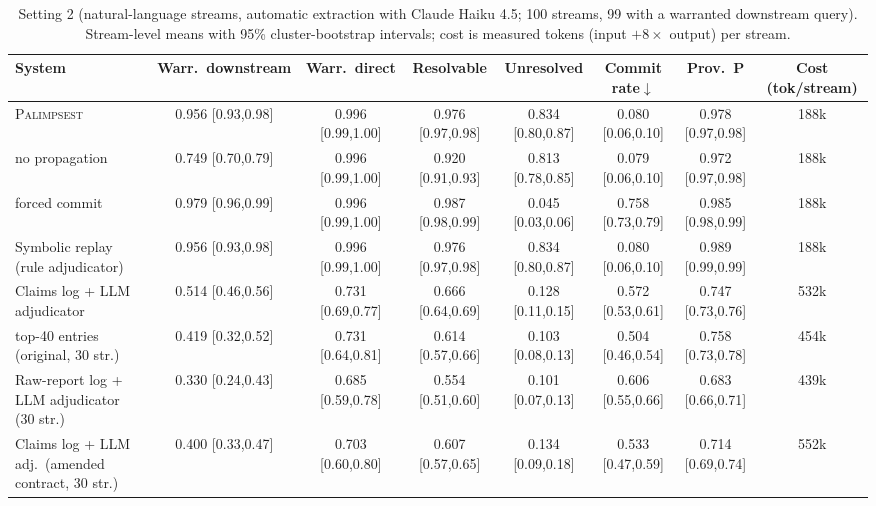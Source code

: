 \begin{table}\centering\footnotesize\setlength{\tabcolsep}{3.5pt}
\caption{Setting 2 (natural-language streams, automatic extraction with Claude Haiku 4.5; 100 streams, 99 with a warranted downstream query). Stream-level means with 95\% cluster-bootstrap intervals; cost is measured tokens (input $+8\times$ output) per stream.}\label{tab:s2}
\begin{tabular}{lccccccc}
\toprule
System & Warr.\ downstream & Warr.\ direct & Resolvable & Unresolved & Commit rate$\downarrow$ & Prov.\ P & Cost (tok/stream) \\
\midrule
\textsc{Palimpsest} & 0.956 {\tiny[0.93,0.98]} & 0.996 {\tiny[0.99,1.00]} & 0.976 {\tiny[0.97,0.98]} & 0.834 {\tiny[0.80,0.87]} & 0.080 {\tiny[0.06,0.10]} & 0.978 {\tiny[0.97,0.98]} & 188k \\
\quad no propagation & 0.749 {\tiny[0.70,0.79]} & 0.996 {\tiny[0.99,1.00]} & 0.920 {\tiny[0.91,0.93]} & 0.813 {\tiny[0.78,0.85]} & 0.079 {\tiny[0.06,0.10]} & 0.972 {\tiny[0.97,0.98]} & 188k \\
\quad forced commit & 0.979 {\tiny[0.96,0.99]} & 0.996 {\tiny[0.99,1.00]} & 0.987 {\tiny[0.98,0.99]} & 0.045 {\tiny[0.03,0.06]} & 0.758 {\tiny[0.73,0.79]} & 0.985 {\tiny[0.98,0.99]} & 188k \\
Symbolic replay (rule adjudicator) & 0.956 {\tiny[0.93,0.98]} & 0.996 {\tiny[0.99,1.00]} & 0.976 {\tiny[0.97,0.98]} & 0.834 {\tiny[0.80,0.87]} & 0.080 {\tiny[0.06,0.10]} & 0.989 {\tiny[0.99,0.99]} & 188k \\
Claims log + LLM adjudicator & 0.514 {\tiny[0.46,0.56]} & 0.731 {\tiny[0.69,0.77]} & 0.666 {\tiny[0.64,0.69]} & 0.128 {\tiny[0.11,0.15]} & 0.572 {\tiny[0.53,0.61]} & 0.747 {\tiny[0.73,0.76]} & 532k \\
\quad top-40 entries (original, 30 str.) & 0.419 {\tiny[0.32,0.52]} & 0.731 {\tiny[0.64,0.81]} & 0.614 {\tiny[0.57,0.66]} & 0.103 {\tiny[0.08,0.13]} & 0.504 {\tiny[0.46,0.54]} & 0.758 {\tiny[0.73,0.78]} & 454k \\
Raw-report log + LLM adjudicator (30 str.) & 0.330 {\tiny[0.24,0.43]} & 0.685 {\tiny[0.59,0.78]} & 0.554 {\tiny[0.51,0.60]} & 0.101 {\tiny[0.07,0.13]} & 0.606 {\tiny[0.55,0.66]} & 0.683 {\tiny[0.66,0.71]} & 439k \\
Claims log + LLM adj.\ (amended contract, 30 str.) & 0.400 {\tiny[0.33,0.47]} & 0.703 {\tiny[0.60,0.80]} & 0.607 {\tiny[0.57,0.65]} & 0.134 {\tiny[0.09,0.18]} & 0.533 {\tiny[0.47,0.59]} & 0.714 {\tiny[0.69,0.74]} & 552k \\

\end{tabular}
\end{table}
